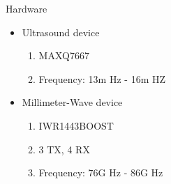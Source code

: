 \documentclass[dvipsnames, handout]{beamer}
\newcommand{\1}{\mathds{1}}	%
\begin{document}
\begin{frame}[t]{Hardware}
\begin{itemize}
\item Ultrasound device
\begin{enumerate}
\item MAXQ7667
\item Frequency: 13m Hz - 16m HZ
\end{enumerate}
\item Millimeter-Wave device
\begin{enumerate}
\item IWR1443BOOST
\item 3 TX, 4 RX
\item Frequency: 76G Hz - 86G Hz
\end{enumerate}
\end{itemize}



\end{frame}
\end{document}
